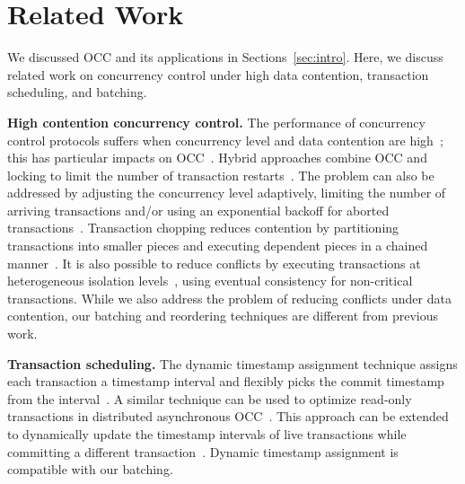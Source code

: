 \section{Related Work}\label{sec:relwork}

We discussed OCC and its applications in Sections~\ref{sec:intro}. 
Here, we discuss related work on concurrency control under high data contention, transaction scheduling, and batching. 

{\bf High contention concurrency control.}
The performance of concurrency control protocols suffers when concurrency level and data contention are high~\cite{franaszek1985limitations}; this has particular impacts on OCC~\cite{agrawal1987concurrency}. Hybrid approaches combine OCC and locking to limit the number of transaction restarts~\cite{thomasian1998distributed,yu1992analysis}. The problem can also be addressed by adjusting the concurrency level adaptively, limiting the number of arriving transactions and/or using an exponential backoff for aborted transactions~\cite{helal1993adaptive}. Transaction chopping reduces contention by partitioning transactions into smaller pieces and executing dependent pieces in a chained manner~\cite{mu2014extracting,shasha1995transaction,xie2015high}. It is also possible to reduce conflicts by executing transactions at heterogeneous isolation levels~\cite{xie2014salt,xie2015high}, using eventual consistency for non-critical transactions. While we also address the problem of reducing conflicts under data contention, our batching and reordering techniques are different from previous work.

{\bf Transaction scheduling.}
The dynamic timestamp assignment technique assigns each transaction a timestamp interval and flexibly picks the commit timestamp from the interval~\cite{bayer1982dynamic}. A similar technique can be used to optimize read-only transactions in distributed asynchronous OCC~\cite{ding2015centiman}. This approach can be extended to dynamically update the timestamp intervals of live transactions while committing a different transaction~\cite{boksenbaum1987concurrent}. Dynamic timestamp assignment is compatible with our batching.

